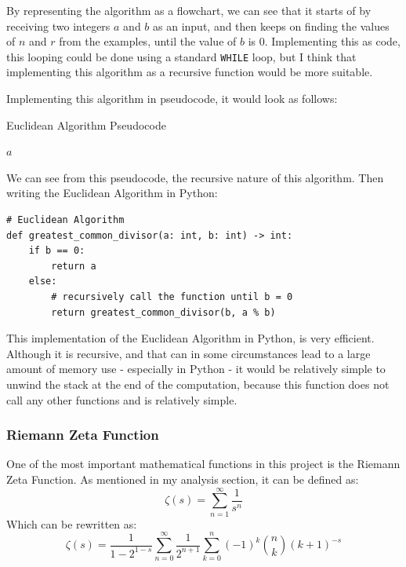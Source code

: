 \documentclass{article}
\begin{document}
By representing the algorithm as a flowchart, we can see that it starts of by receiving two integers $a$ and $b$ as an input, and then keeps on finding the values of $n$ and $r$ from the examples, until the value of $b$ is $0$. Implementing this as code, this looping could be done using a standard \texttt{WHILE} loop, but I think that implementing this algorithm as a recursive function would be more suitable.

Implementing this algorithm in pseudocode, it would look as follows:
\begin{algorithm}
    \caption{Euclidean Algorithm Pseudocode}
    \begin{algorithmic}
                \State \Return $a$
            \Else
                \State\Return{}
            \EndIf
        \EndFunction
    \end{algorithmic}
\end{algorithm}

We can see from this pseudocode, the recursive nature of this algorithm.
\clearpage
Then writing the Euclidean Algorithm in Python:

\begin{lstlisting}
# Euclidean Algorithm
def greatest_common_divisor(a: int, b: int) -> int:
    if b == 0:
        return a
    else:
        # recursively call the function until b = 0
        return greatest_common_divisor(b, a % b)
\end{lstlisting}

This implementation of the Euclidean Algorithm in Python, is very efficient. Although it is recursive, and that can in some circumstances lead to a large amount of memory use - especially in Python - it would be relatively simple to unwind the stack at the end of the computation, because this function does not call any other functions and is relatively simple.


\subsubsection{Riemann Zeta Function}
One of the most important mathematical functions in this project is the Riemann Zeta Function. As mentioned in my analysis section, it can be defined as:
    $$\zeta(s) = \sum^{\infty}_{n=1}\frac{1}{s^n}$$
Which can be rewritten as:
    $$\zeta(s) = \frac{1}{1-2^{1-s}} \sum_{n=0}^{\infty} \frac{1}{2^{n+1}} \sum_{k=0}^{n} (-1)^k \binom{n}{k} (k+1)^{-s}$$
\end{document}
